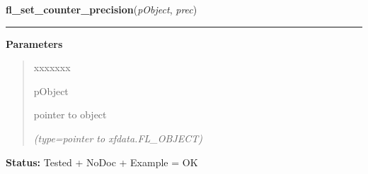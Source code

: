     \label{xformslib:library:fl_set_counter_precision}

    \vspace{0.5ex}

\hspace{.8\funcindent}\begin{boxedminipage}{\funcwidth}

    \raggedright \textbf{fl\_set\_counter\_precision}(\textit{pObject}, \textit{prec})

    \vspace{-1.5ex}

    \rule{\textwidth}{0.5\fboxrule}
\setlength{\parskip}{2ex}
\setlength{\parskip}{1ex}
      \textbf{Parameters}
      \vspace{-1ex}

      \begin{quote}
        \begin{Ventry}{xxxxxxx}

          \item[pObject]

          pointer to object

            {\it (type=pointer to xfdata.FL\_OBJECT)}

        \end{Ventry}

      \end{quote}

\textbf{Status:} Tested + NoDoc + Example = OK



    \end{boxedminipage}

    \label{xformslib:library:fl_get_counter_precision}

    \vspace{0.5ex}

